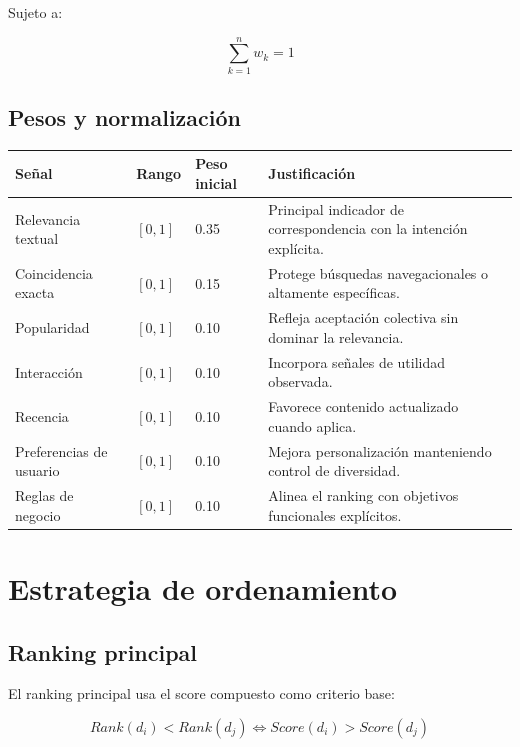\documentclass[12pt,a4paper]{article}
\begin{document}
Sujeto a:

\[
\sum_{k=1}^{n} w_k = 1
\]

\subsection{Pesos y normalización}

\begin{longtable}{p{4cm}p{3cm}p{3cm}p{4cm}}
\toprule
\textbf{Señal} & \textbf{Rango} & \textbf{Peso inicial} & \textbf{Justificación} \\
\midrule
\endhead

Relevancia textual & $[0,1]$ & 0.35 & Principal indicador de correspondencia con la intención explícita. \\

Coincidencia exacta & $[0,1]$ & 0.15 & Protege búsquedas navegacionales o altamente específicas. \\

Popularidad & $[0,1]$ & 0.10 & Refleja aceptación colectiva sin dominar la relevancia. \\

Interacción & $[0,1]$ & 0.10 & Incorpora señales de utilidad observada. \\

Recencia & $[0,1]$ & 0.10 & Favorece contenido actualizado cuando aplica. \\

Preferencias de usuario & $[0,1]$ & 0.10 & Mejora personalización manteniendo control de diversidad. \\

Reglas de negocio & $[0,1]$ & 0.10 & Alinea el ranking con objetivos funcionales explícitos. \\

\bottomrule
\end{longtable}

\section{Estrategia de ordenamiento}

\subsection{Ranking principal}

El ranking principal usa el score compuesto como criterio base:

\[
Rank(d_i) < Rank(d_j) \iff Score(d_i) > Score(d_j)
\]
\end{document}
